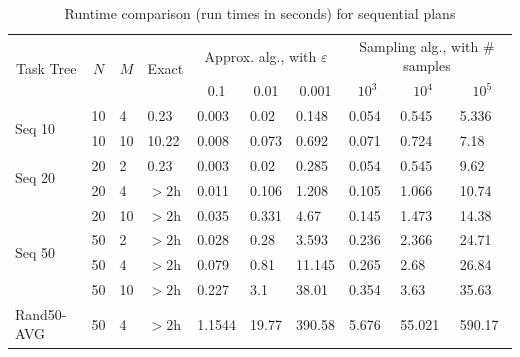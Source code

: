 \documentclass{article}
\begin{document}
\begin{table}[htb!]
	{\footnotesize
		\begin{tabular}{|l|l|l|l||l|l|l||l|l|l|}
			\hline
			\multicolumn{1}{|c|}{\multirow{2}{*}{Task Tree}} & \multicolumn{1}{c|}{\multirow{2}{*}{$N$}} & \multicolumn{1}{c|}{\multirow{2}{*}{$M$}} & \multirow{2}{*}{Exact} & \multicolumn{3}{c|}{Approx. alg., with $\varepsilon$} & \multicolumn{3}{c|}{Sampling alg., with \# samples} \\ \cline{5-10} 
			\multicolumn{1}{|c|}{} & \multicolumn{1}{c|}{} & \multicolumn{1}{c|}{} &  & \multicolumn{1}{c|}{0.1} & \multicolumn{1}{c|}{0.01} & \multicolumn{1}{c|}{0.001} & \multicolumn{1}{c|}{$10^{3}$} & \multicolumn{1}{c|}{$10^{4}$} & \multicolumn{1}{c|}{$10^{5}$}  \\ \hline \hline
			\multirow{2}{*}{Seq 10} & 10 & 4 & 0.23 & 0.003 & 0.02 & 0.148  & 0.054 & 0.545 &5.336  \\ \cline{2-10} 
			& 10 & 10 & 10.22 & 0.008 & 0.073 & 0.692 & 0.071 & 0.724 & 7.18  \\ \hline
			\multirow{2}{*}{Seq 20} & 20 & 2 & 0.23 & 0.003 & 0.02 & 0.285  & 0.054 & 0.545 & 9.62  \\ \cline{2-10} 
			& 20 & 4 & $> 2$h & 0.011 & 0.106 & 1.208 & 0.105 & 1.066 & 10.74 \\ \cline{2-10} 
			& 20 & 10 & $> 2$h & 0.035 & 0.331 & 4.67 & 0.145 & 1.473 & 14.38  \\ \hline
			\multirow{2}{*}{Seq 50} & 50 & 2 & $> 2$h & 0.028 &  0.28 & 3.593  & 0.236 & 2.366 & 24.71  \\ \cline{2-10} 
			& 50 & 4 & $> 2$h & 0.079 & 0.81 & 11.145 & 0.265 & 2.68 & 26.84\\ \cline{2-10}  
			& 50 & 10 & $> 2$h & 0.227 & 3.1 & 38.01 & 0.354 & 3.63 & 35.63  \\ \hline
			\multirow{1}{*}{Rand50-AVG} & 50 & 4 & $>2$h & 1.1544 & 19.77 & 390.58 & 5.676 & 55.021 & 590.17 \\   \hline
		\end{tabular}
		\caption{Runtime comparison (run times in seconds) for sequential plans}
		\label{tab:runtimes2}
	}
\end{table}

\end{document}
